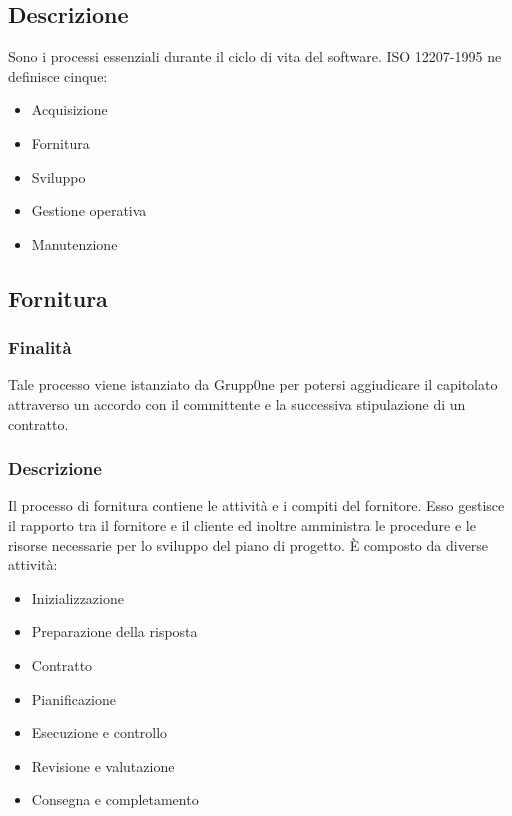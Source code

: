 \documentclass[../norme-di-progetto.tex]{subfiles}
\begin{document}
\subsection{Descrizione}
\label{sub:descrizione}
Sono i processi essenziali durante il ciclo di vita del software. ISO 12207-1995 ne definisce cinque:
\begin{itemize}
	\item Acquisizione
	\item Fornitura
	\item Sviluppo
	\item Gestione operativa
	\item Manutenzione
\end{itemize}
\subsection{Fornitura}
\label{sub:fornitura}
\subsubsection{Finalità}
\label{subs:finalità}
Tale processo viene istanziato da Grupp0ne per potersi aggiudicare il capitolato attraverso un accordo con il committente e la successiva stipulazione di un contratto.
\subsubsection{Descrizione}
\label{subs:descrizione}
Il processo di fornitura contiene le attività e i compiti del fornitore. Esso gestisce il rapporto tra il fornitore e il cliente ed inoltre amministra le procedure e le risorse necessarie per lo sviluppo del piano di progetto. È composto da diverse attività:
\begin{itemize}
\item Inizializzazione
\item Preparazione della risposta
\item Contratto
\item Pianificazione
\item Esecuzione e controllo
\item Revisione e valutazione
\item Consegna e completamento
\end{itemize}
\end{document}
